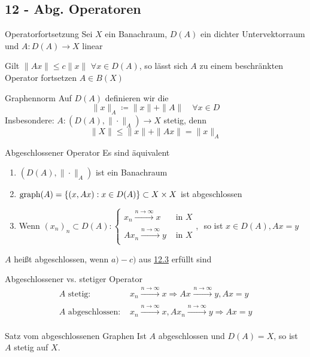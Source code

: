 \subsection*{12 - Abg. Operatoren}

	\begin{karte}{Operatorfortsetzung}
		Sei $X$ ein Banachraum, $D(A)$ ein dichter Untervektorraum und $A: D(A) \rightarrow X$ linear
	
		Gilt $\| A x \| \leq c \| x \|$ $\forall x \in D(A)$, so lässt sich $A$ zu einem beschränkten Operator fortsetzen $A \in B(X)$	
	\end{karte}
	


	\begin{karte}{Graphennorm}
		Auf $D(A)$ definieren wir die 
		\[ \| x \|_{A} \coloneqq \|x \| + \| A \| \quad \forall x \in D \]
		Insbesondere: $A: (D(A), \| \cdot \|_{A}) \rightarrow X$ stetig, denn 
		\[ \| X \| \leq \|x \| + \| A x \| = \| x \|_{A} \]
	\end{karte}


	\begin{karte}{Abgeschlossener Operator}
		Es sind äquivalent
		\begin{enumerate}[label=\alph*\upshape)]
			\item $\left( D(A), \| \cdot \|_{A} \right)$ ist ein Banachraum
			\item $\operatorname{graph}(A) = \{ (x, A x): x \in D(A) \} \subset X \times X$ ist abgeschlossen
			\item Wenn $(x_{n})_{n} \subset D(A): \begin{cases}
			x_{n} \xrightarrow[]{n \rightarrow \infty} x & \text{ in } X \\ A x_{n} \xrightarrow[]{n \rightarrow \infty} y & \text{ in } X \end{cases}$, $ $ so ist $x \in D(A), A x = y$
		\end{enumerate}
	
		$A$ hei{\ss}t abgeschlossen, wenn $a) - c)$ aus \hyperref[satz:12.3]{12.3} erfüllt sind	
	\end{karte}


	\begin{karte}{Abgeschlossener vs. stetiger Operator}
		\begin{align*}
			A \text{ stetig: } & x_{n} \xrightarrow[]{n \rightarrow \infty} x \Rightarrow Ax_{} \xrightarrow[]{n \rightarrow \infty} y, Ax = y \\
			A \text{ abgeschlossen: } & x_{n} \xrightarrow[]{n \rightarrow \infty} x, A x_{n} \xrightarrow[]{n \rightarrow \infty} y \Rightarrow Ax = y
		\end{align*}
	\end{karte}


	\begin{karte}{Satz vom abgeschlossenen Graphen}
		Ist $A$ abgeschlossen und $D(A) = X$, so ist $A$ stetig auf $X$.
	\end{karte}

